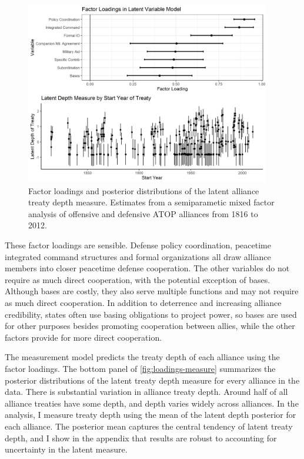 \documentclass[12pt]{article}
\begin{document}
\begin{figure}[hbtp]
\centering
\includegraphics[width=0.95\textwidth]{../figures/loadings-measure.png}
\caption{Factor loadings and posterior distributions of the latent alliance treaty depth measure. Estimates from a semiparametic mixed factor analysis of offensive and defensive ATOP alliances from 1816 to 2012.}
\label{fig:loadings-measure}
\end{figure}


These factor loadings are sensible. 
Defense policy coordination, peacetime integrated command structures and formal organizations all draw alliance members into closer peacetime defense cooperation. 
The other variables do not require as much direct cooperation, with the potential exception of bases.
Although bases are costly, they also serve multiple functions and may not require as much direct cooperation. 
In addition to deterrence and increasing alliance credibility, states often use basing obligations to project power, so bases are used for other purposes besides promoting cooperation between allies, while the other factors provide for more direct cooperation.  


The measurement model predicts the treaty depth of each alliance using the factor loadings. 
The bottom panel of \autoref{fig:loadings-measure} summarizes the posterior distributions of the latent treaty depth measure for every alliance in the data. 
There is substantial variation in alliance treaty depth. 
Around half of all alliance treaties have some depth, and depth varies widely across alliances.
In the analysis, I measure treaty depth using the mean of the latent depth posterior for each alliance. 
The posterior mean captures the central tendency of latent treaty depth, and I show in the appendix that results are robust to accounting for uncertainty in the latent measure. 
\end{document}
